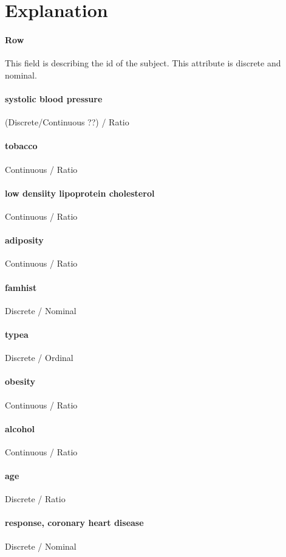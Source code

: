 \section{Explanation}

\paragraph{Row} This field is describing the id of the subject. This attribute is discrete and nominal.

\paragraph{systolic blood pressure} (Discrete/Continuous ??) / Ratio

\paragraph{tobacco} Continuous / Ratio

\paragraph{low densiity lipoprotein cholesterol} Continuous / Ratio

\paragraph{adiposity} Continuous / Ratio

\paragraph{famhist} Discrete / Nominal

\paragraph{typea} Discrete / Ordinal

\paragraph{obesity} Continuous / Ratio

\paragraph{alcohol} Continuous / Ratio

\paragraph{age} Discrete / Ratio

\paragraph{response, coronary heart disease} Discrete / Nominal